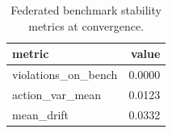 \begin{table}
\caption{Federated benchmark stability metrics at convergence.}
\label{tab:federated_benchmark}
\begin{tabular}{lr}
\toprule
metric & value \\
\midrule
violations_on_bench & 0.0000 \\
action_var_mean & 0.0123 \\
mean_drift & 0.0332 \\
\bottomrule
\end{tabular}
\end{table}
